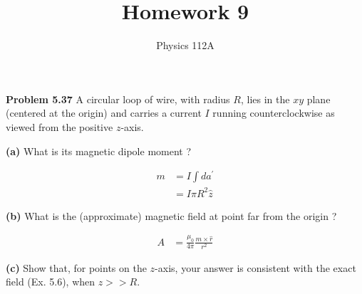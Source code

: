 \documentclass{article}
\title{Homework 9}
\author{Physics 112A}
\date{}
\begin{document}
\maketitle

\textbf{Problem 5.37}
A circular loop of wire, with radius $R$, lies in the $xy$ plane (centered at the origin) and carries a current $I$ running counterclockwise as viewed from the positive $z$-axis.

\textbf{(a)}
What is its magnetic dipole moment ?

\begin{equation*}
\begin{split}
	m & = I \int da^\prime \\
	& = \boxed{I \pi R^2 \hat{z}}
\end{split}
\end{equation*}

\textbf{(b)}
What is the (approximate) magnetic field at point far from the origin ?

\begin{equation*}
\begin{split}
	A & = \frac{\mu_0}{4 \pi} \frac{m \times \hat{r}}{r^2}
\end{split}
\end{equation*}

\textbf{(c)}
Show that, for points on the $z$-axis, your answer is consistent with the exact field (Ex. 5.6), when $z >> R$.

\begin{equation*}
\begin{split}
\end{split}
\end{equation*}
\end{document}

